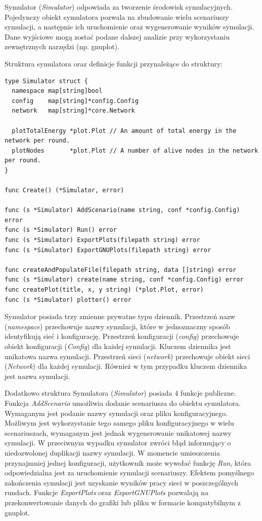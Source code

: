 \documentclass[a4paper,12pt,twoside,openany]{report}
\begin{document}
Symulator (\textit{Simulator}) odpowiada za tworzenie środowisk symulacyjnych.
Pojedynczy obiekt symulatora pozwala na zbudowanie wielu scenariuszy symulacji, a następnie ich uruchomienie oraz
wygenerowanie wyników symulacji. Dane wyjściowe mogą zostać podane dalszej analizie przy wykorzystaniu zewnętrznych narzędzi (np. gnuplot).

Struktura symulatora oraz definicje funkcji przynależące do struktury:
 
\begin{lstlisting}
type Simulator struct {
  namespace map[string]bool
  config    map[string]*config.Config
  network   map[string]*core.Network

  plotTotalEnergy *plot.Plot // An amount of total energy in the network per round.
  plotNodes       *plot.Plot // A number of alive nodes in the network per round.
}

func Create() (*Simulator, error)

func (s *Simulator) AddScenario(name string, conf *config.Config) error
func (s *Simulator) Run() error
func (s *Simulator) ExportPlots(filepath string) error
func (s *Simulator) ExportGNUPlots(filepath string) error

func createAndPopulateFile(filepath string, data []string) error
func (s *Simulator) create(name string, conf *config.Config) error
func createPlot(title, x, y string) (*plot.Plot, error)
func (s *Simulator) plotter() error
\end{lstlisting}

Symulator posiada trzy zmienne prywatne typu dziennik. Przestrzeń nazw (\textit{namespace}) przechowuje nazwy symulacji, które w jednoznaczny sposób identyfikują sieć i konfigurację.
Przestrzeń konfiguracji (\textit{config}) przechowuje obiekt konfiguracji (\textit{Config}) dla każdej symulacji. Kluczem dziennika jest unikatowa nazwa symulacji.
Przestrzeń sieci (\textit{network}) przechowuje obiekt sieci (\textit{Network}) dla każdej symulacji. Również w tym przypadku kluczem dziennika jest nazwa symulacji.

Dodatkowo struktura Symulatora (\textit{Simulator}) posiada 4 funkcje publiczne. Funkcja \textit{AddScenario} umożliwia dodanie scenariusza do obiektu symulatora.
Wymaganym jest podanie nazwy symulacji oraz pliku konfiguracyjnego. Możliwym jest wykorzystanie tego samego pliku konfiguracyjnego w wielu scenariuszach, wymaganym jest jednak
wygenerowanie unikatowej nazwy symulacji. W przeciwnym wypadku symulator zwróci błąd informujący o niedozwolonej duplikacji nazwy symulacji.
W momencie umieszczenia	przynajmniej jednej konfiguracji, użytkownik może wywołać funkcję \textit{Run}, która odpowiedzialna jest za uruchomienie symulacji scenariuszy.
Efektem pomyślnego zakończenia symulacji jest uzyskanie wyników pracy sieci w poszczególnych rundach. Funkcje \textit{ExportPlots} oraz \textit{ExportGNUPlots} pozwalają na
przekonwertowanie danych do grafiki lub pliku w formacie kompatybilnym z gnuplot.
\end{document}
